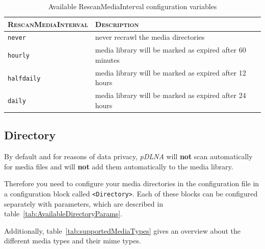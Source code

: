 \documentclass[a4paper,oneside,10pt]{report}
\begin{document}
\begin{table}
	\centering
	\begin{tabular}{|p{12em}|p{20em}|}
		\hline
		\textsc{RescanMediaInterval} & \textsc{Description}\\
		\hline
		\hline
		\verb|never| & never recrawl the media directories \\
		\hline
		\verb|hourly| & media library will be marked as expired after 60 minutes \\
		\hline
		\verb|halfdaily| & media library will be marked as expired after 12 hours \\
		\hline
		\verb|daily| & media library will be marked as expired after 24 hours \\
		\hline
	\end{tabular}
	\caption{Available RescanMediaInterval configuration variables}
	\label{tab:RescanMediaIntervalyParams}
\end{table}

\subsection{Directory}
\label{configDirectory}

By default and for reasons of data privacy, {\em pDLNA} will \textbf{not} scan automatically for media files and will \textbf{not} add them automatically to the media library.

Therefore you need to configure your media directories in the configuration file in a configuration block called \verb|<Directory>|. Each of these blocks can be configured separately with parameters, which are described in table~\ref{tab:AvailableDirectoryParams}.

Additionally, table~\ref{tab:supportedMediaTypes} gives an overview about the different media types and their mime types.
\end{document}
